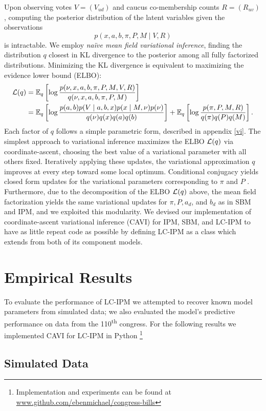 \documentclass{article}
\begin{document}
Upon observing votes $V = (V_{ud})$ and caucus co-membership counts $R = (R_{uv})$, computing the posterior distribution of the latent variables given the observations
$$
p(x, a, b, \pi, P, M \mid V, R)
$$
 is intractable. We employ {\sl na\"ive mean field variational inference}, finding the distribution $q$ closest in KL divergence to the posterior among all fully factorized distributions. Minimizing the KL divergence is equivalent to maximizing the evidence lower bound (ELBO):
\begin{align*}
\mathcal{L}(q)
&= \mathbb{E}_q\left[\log \frac{p(\nu, x, a, b, \pi, P, M, V, R)}{q(\nu, x, a, b, \pi, P, M)}\right] \\
&= \mathbb{E}_q\left[\log \frac{p(a, b)p(V\mid a,b,x)p(x\mid M, \nu)p(\nu)}{q(\nu)q(x)q(a)q(b)}\right]
+ \mathbb{E}_q\left[\log \frac{p(\pi, P, M, R)}{q(\pi)q(P)q(M)}\right].
\end{align*}
Each factor of $q$ follows a simple parametric form, described in appendix \ref{vi}. The simplest approach to variational inference maximizes the ELBO $\mathcal{L}(q)$ via coordinate-ascent, choosing the best value of a variational parameter with all others fixed. Iteratively applying these updates, the variational approximation $q$ improves at every step toward some local optimum. Conditional conjugacy yields closed form updates for the variational parameters corresponding to $\pi$ and $P$ \cite{Blei2016}. Furthermore, due to the decomposition of the ELBO $\mathcal{L}(q)$ above, the mean field factorization yields the same variational updates for $\pi, P, a_d$, and $b_d$ as in SBM and IPM, and we exploited this modularity. We devised our implementation of coordinate-ascent variational inference (CAVI) for IPM, SBM, and LC-IPM to have as little repeat code as possible by defining LC-IPM as a class which extends from both of its component models. 

\section{Empirical Results}
\label{results}
To evaluate the performance of LC-IPM we attempted to recover known model parameters from simulated data; we also evaluated the model's predictive performance on data from the 110\textsuperscript{th} congress. For the following results we implemented CAVI for LC-IPM in Python \footnote{Implementation and experiments can be found at \url{www.github.com/ebenmichael/congress-bills}}
\subsection{Simulated Data}
\end{document}
